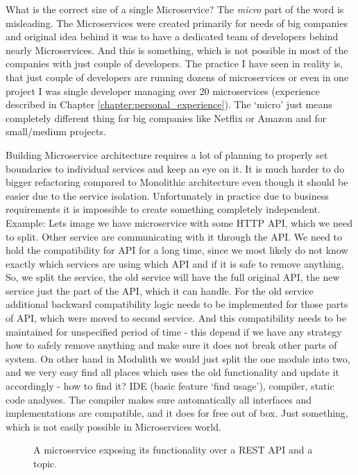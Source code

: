 What is the correct size of a single Microservice? The \textit{micro} part of the word is misleading. The Microservices were created primarily for needs of big companies and original idea behind it was to have a dedicated team of developers behind nearly Microservices. And this is something, which is not possible in most of the companies with just couple of developers. The practice I have seen in reality is, that just couple of developers are running dozens of microservices or even in one project I was single developer managing over 20 microservices (experience described in Chapter \ref{chapter:personal_experience}). The `micro' just means completely different thing for big companies like Netflix or Amazon and for small/medium projects.

Building Microservice architecture requires a lot of planning to properly set boundaries to individual services and keep an eye on it. It is much harder to do bigger refactoring compared to Monolithic architecture even though it should be easier due to the service isolation. Unfortunately in practice due to business requirements it is impossible to create something completely independent. Example: Lets image we have microservice with some HTTP API, which we need to split. Other service are communicating with it through the API. We need to hold the compatibility for API for a long time, since we most likely do not know exactly which services are using which API and if it is safe to remove anything. So, we split the service, the old service will have the full original API, the new service just the part of the API, which it can handle. For the old service additional backward compatibility logic needs to be implemented for those parts of API, which were moved to second service. And this compatibility needs to be maintained for unspecified period of time - this depend if we have any strategy how to safely remove anything and make sure it does not break other parts of system. On other hand in Modulith we would just split the one module into two, and we very easy find all places which uses the old functionality and update it accordingly - how to find it? IDE (basic feature `find usage'), compiler, static code analyses. The compiler makes sure automatically all interfaces and implementations are compatible, and it does for free out of box. Just something, which is not easily possible in Microservices world.


\begin{figure}
    \centering
    
    \caption{A microservice exposing its functionality over a REST API and a topic. \cite{BUILDING_MS_WHAT_ARE}\label{img:microservices_basic}}
\end{figure}



